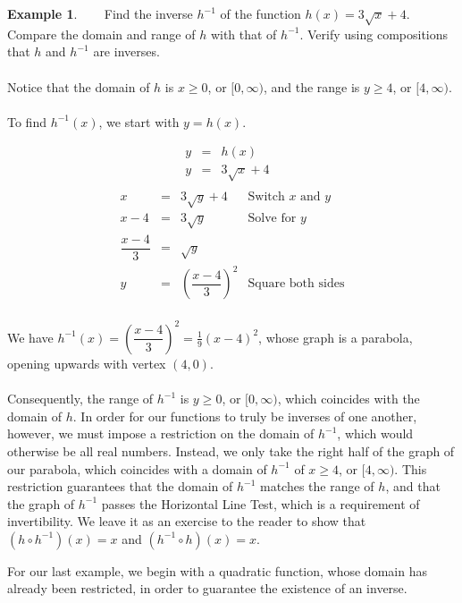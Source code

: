 \documentclass[11pt]{book}
\theoremstyle{definition}  %
\newtheorem{example}{Example}[chapter]
\begin{document}
\begin{example}~~~  Find the inverse $h^{-1}$ of the function $h(x) = 3\sqrt{x}+4$.  Compare the domain and range of $h$ with that of $h^{-1}$.  Verify using compositions that $h$ and $h^{-1}$ are inverses.\\
~\\
Notice that the domain of $h$ is $x\geq 0$, or $[0,\infty)$, and the range is $y\geq 4$, or $[4,\infty)$.\\
~\\
To find $h^{-1}(x)$, we start with $y=h(x)$.

\[ \begin{array}{rclr}
y & = & h(x) & \\ [5pt]
y & = &  3\sqrt{x}+4 & \\ [7pt]
\end{array} \]
\[ \begin{array}{rclr}
x & = & 3\sqrt{y}+4 & \mbox{Switch $x$ and $y$} \\ [3pt]
x-4 & = & 3\sqrt{y} & \mbox{Solve for $y$} \\ [3pt]
\dfrac{x-4}{3} & = & \sqrt{y} & \\
y & = & \left(\dfrac{x-4}{3}\right)^2 & \mbox{Square both sides}\\ [8pt]
\end{array} \]

We have $h^{-1}(x) = \left(\dfrac{x-4}{3}\right)^2=\frac{1}{9}(x-4)^2$, whose graph is a parabola, opening upwards with vertex $(4,0)$.\\
~\\
Consequently, the range of $h^{-1}$ is $y\geq 0$, or $[0,\infty)$, which coincides with the domain of $h$.  In order for our functions to truly be inverses of one another, however, we must impose a restriction on the domain of $h^{-1}$, which would otherwise be all real numbers.  Instead, we only take the right half of the graph of our parabola, which coincides with a domain of $h^{-1}$ of $x\geq 4$, or $[4,\infty)$.  This restriction guarantees that the domain of $h^{-1}$ matches the range of $h$, and that the graph of $h^{-1}$ passes the Horizontal Line Test, which is a requirement of invertibility.  We leave it as an exercise to the reader to show that $(h\circ h^{-1})(x)=x$ and $(h^{-1}\circ h)(x)=x$.
\end{example}

For our last example, we begin with a quadratic function, whose domain has already been restricted, in order to guarantee the existence of an inverse.
\end{document}
